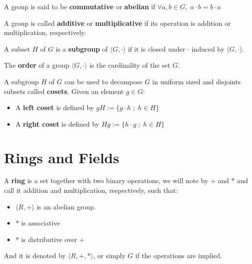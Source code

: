 \documentclass[Ingles]{ic-tese-v3}
\begin{document}
\begin{definition}
  A group is said to be \textbf{commutative} or \textbf{abelian}
  if $\forall a, b \in G, \; a\cdot b = b\cdot a$
\end{definition}

\noindent
A group is called \textbf{additive} or \textbf{multiplicative} if its
operation is addition or multiplication, respectively.

\begin{definition}
  A subset $H$ of $G$ is a \textbf{subgroup} of $\langle G,\cdot \rangle$ if it is
  closed under $\cdot$ induced by $\langle G,\cdot \rangle$.
\end{definition}

\begin{definition}
  The \textbf{order} of a group $\langle G,\cdot\rangle$ is the cardinality of the set $G$.
\end{definition}

\begin{definition}
  A subgroup $H$ of $G$ can be used to decompose $G$ in uniform sized and
  disjoints subsets called \textbf{cosets}. Given an element $g \in G$:
  \begin{itemize}
  \item A \textbf{left coset} is defined by $gH := \{g\cdot h \; ; \; h \in H\}$
  \item A \textbf{right coset} is defined by $Hg := \{h\cdot g \; ; \; h \in H\}$
  \end{itemize}
\end{definition}

\section{Rings and Fields}

\begin{definition}
  A \textbf{ring} is a set together with two binary operations, we will note by
  $+$ and $*$ and call it addition and multiplication, respectively, such that:
  \begin{itemize}
  \item $\langle R,+\rangle$ is an abelian group.
  \item $*$ is associative
  \item $*$ is distributive over $+$
  \end{itemize}

  And it is denoted by $\langle R,+,*\rangle$, or simply $G$ if the operations are implied.
\end{definition}
\end{document}
